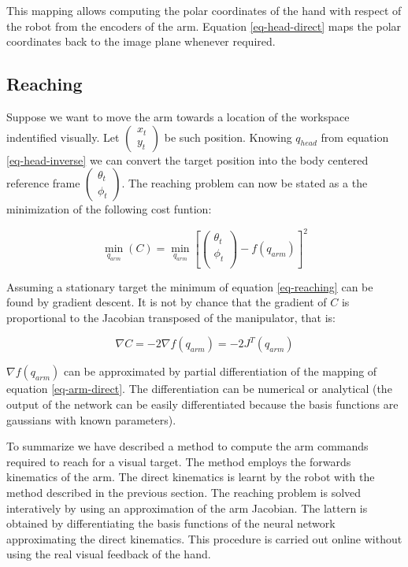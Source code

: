 This mapping allows computing the polar coordinates of the hand with 
respect of the robot from the encoders of the arm. Equation 
\ref{eq-head-direct} maps the polar coordinates back to the image plane 
whenever required.

\subsection{Reaching}
\label{sec-reaching}
Suppose we want to move the arm towards a location of the workspace 
indentified visually. Let $\left(\begin{array}{c} x_t \\ y_t\end{array}\right)$
be such position. Knowing $q_{head}$ from equation \ref{eq-head-inverse} 
we can convert the target position into the body centered reference frame 
$\left(\begin{array}{c} \theta_t  \\ \phi_t\end{array}\right)$. The 
reaching problem can now be stated as a the minimization of the following 
cost funtion:

\begin{equation}
  \displaystyle\min_{q_{arm}}\left(C\right)=\displaystyle\min_{q_{arm}}\left[
  \left(
  \begin{array}{c}
    \theta_t \\
    \phi_t \\
    \end{array}\right)
  -f \left(q_{arm}\right)
  \right]^2
\label{eq-reaching1}
\end{equation}

Assuming a stationary target the minimum of equation \ref{eq-reaching} 
can be found by gradient descent. It is not by chance that the 
gradient of $C$ is proportional to the Jacobian transposed 
of the manipulator, that is:

\begin{equation}
  \nabla C=-2\nabla f\left(q_{arm}\right)=-2J^T\left(q_{arm}\right)
\label{eq-gradient}
\end{equation}

$\nabla f\left(q_{arm}\right)$ can be approximated by partial 
 differentiation of the mapping of equation \ref{eq-arm-direct}. The 
differentiation can be numerical or analytical (the output of the 
network can be easily differentiated because the basis functions are
gaussians with known parameters).

To summarize we have described a method to compute the arm commands
required to reach for a visual target. The method employs the 
forwards kinematics of the arm. The direct kinematics is learnt by the 
robot with the method described in the previous section. The reaching 
problem is solved interatively by using an approximation of the arm
Jacobian. The lattern is obtained by differentiating the basis functions 
of the neural network approximating the direct kinematics. This procedure
is carried out online without using the real visual feedback of the hand.

